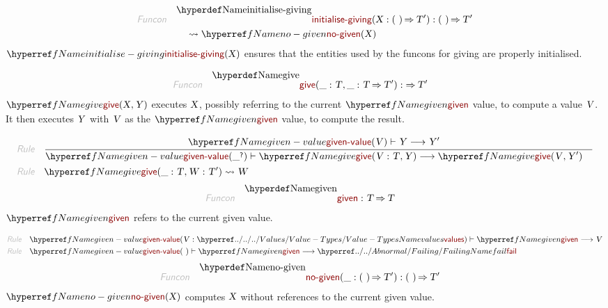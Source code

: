 \begin{align*}
  \KEY{Funcon} \quad
  & \NAMEDECL{initialise-giving}(
                       \VAR{X} : (   \  ) \TO \VAR{T}') 
    : (   \  ) \TO \VAR{T}' \\&\quad
    \leadsto \NAMEREF{no-given}
               (  \VAR{X} )
\end{align*}
$\SHADE{\NAMEREF{initialise-giving}
           (  \VAR{X} )}$ ensures that the entities used by the funcons for
  giving are properly initialised.

\begin{align*}
  \KEY{Funcon} \quad
  & \NAMEDECL{give}(
                       \_ : \VAR{T}, \_ : \VAR{T} \TO \VAR{T}') 
    :  \TO \VAR{T}' 
\end{align*}
$\SHADE{\NAMEREF{give}
           (  \VAR{X}, 
                  \VAR{Y} )}$ executes $\SHADE{\VAR{X}}$, possibly referring to the current $\SHADE{\NAMEREF{given}}$ value,
  to compute a value $\SHADE{\VAR{V}}$. It then executes $\SHADE{\VAR{Y}}$ with $\SHADE{\VAR{V}}$ as the $\SHADE{\NAMEREF{given}}$ value,
  to compute the result.

\begin{align*}
  \KEY{Rule} \quad
    & \RULE{
      & \NAMEREF{given-value} (  \VAR{V} ) \vdash \VAR{Y} \TRANS 
          \VAR{Y}'
      }{
      & \NAMEREF{given-value} (  \_\QUERY ) \vdash \NAMEREF{give}
                      (  \VAR{V} : \VAR{T}, 
                             \VAR{Y} ) \TRANS 
          \NAMEREF{give}
            (  \VAR{V}, 
                   \VAR{Y}' )
      }
\\
  \KEY{Rule} \quad
    & \NAMEREF{give}
        (  \_ : \VAR{T}, 
               \VAR{W} : \VAR{T}' ) \leadsto 
        \VAR{W}
\end{align*}
\begin{align*}
  \KEY{Funcon} \quad
  & \NAMEDECL{given} 
    : \VAR{T} \TO \VAR{T} 
\end{align*}
$\SHADE{\NAMEREF{given}}$ refers to the current given value.

\begin{align*}
  \KEY{Rule} \quad
    & \NAMEREF{given-value} (  \VAR{V} : \NAMEHYPER{../../../Values}{Value-Types}{values} ) \vdash \NAMEREF{given} \TRANS 
        \VAR{V}
\\
  \KEY{Rule} \quad
    & \NAMEREF{given-value} (   \  ) \vdash \NAMEREF{given} \TRANS 
        \NAMEHYPER{../../Abnormal}{Failing}{fail}
\end{align*}
\begin{align*}
  \KEY{Funcon} \quad
  & \NAMEDECL{no-given}(
                       \_ : (   \  ) \TO \VAR{T}') 
    : (   \  ) \TO \VAR{T}' 
\end{align*}
$\SHADE{\NAMEREF{no-given}
           (  \VAR{X} )}$ computes $\SHADE{\VAR{X}}$ without references to the current given value.

